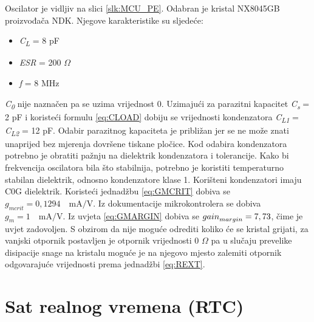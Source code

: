 Oscilator je vidljiv na slici \ref{slk:MCU_PE}. Odabran je kristal NX8045GB proizvođača NDK. Njegove karakteristike su sljedeće:
\begin{itemize}
    \item \textit{C\textsubscript{L}} = 8 pF
    \item \textit{ESR} = 200 $\Omega$
    \item \textit{f} = 8 MHz
\end{itemize}
\textit{C\textsubscript{0}} nije naznačen pa se uzima vrijednost 0. Uzimajući za parazitni kapacitet \textit{C\textsubscript{s}} = 2 pF i koristeći formulu \ref{eq:CLOAD} dobiju se vrijednosti kondenzatora \textit{C\textsubscript{L1}} = \textit{C\textsubscript{L2}} = 12 pF. Odabir parazitnog kapaciteta je približan jer se ne može znati unaprijed bez mjerenja dovršene tiskane pločice. Kod odabira kondenzatora potrebno je obratiti pažnju na dielektrik kondenzatora i tolerancije. Kako bi frekvencija oscilatora bila što stabilnija, potrebno je koristiti temperaturno stabilan dielektrik, odnosno kondenzatore klase 1. Korišteni kondenzatori imaju C0G dielektrik. Koristeći jednadžbu \ref{eq:GMCRIT} dobiva se ${g_{mcrit} = 0,1294 \quad \textrm{mA/V}}$. Iz dokumentacije mikrokontrolera se dobiva ${g_m = 1\quad \textrm{mA/V}}$. Iz uvjeta \ref{eq:GMARGIN} dobiva se ${{gain}_{margin}=\nolinebreak 7,73}$, čime je uvjet zadovoljen. S obzirom da nije moguće odrediti koliko će se kristal grijati, za vanjski otpornik postavljen je otpornik vrijednosti 0 $\Omega$ pa u slučaju prevelike disipacije snage na kristalu moguće je na njegovo mjesto zalemiti otpornik odgovarajuće vrijednosti prema jednadžbi \ref{eq:REXT}.

\section{Sat realnog vremena (RTC)}

